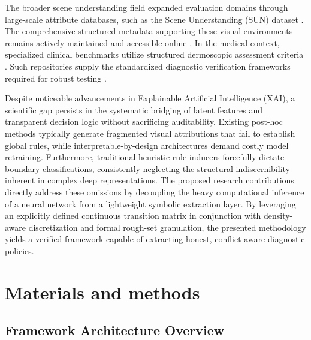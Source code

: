 \documentclass[make,article,submit,pdftex,moreauthors]{Definitions/mdpi}
\begin{document}
The broader scene understanding field expanded evaluation domains through large-scale attribute databases, such as the Scene Understanding (SUN) dataset \cite{Patterson2014SUN}. The comprehensive structured metadata supporting these visual environments remains actively maintained and accessible online \cite{SUNAttributesWebsite}. In the medical context, specialized clinical benchmarks utilize structured dermoscopic assessment criteria \cite{Kawahara2019Derm7pt}. Such repositories supply the standardized diagnostic verification frameworks required for robust testing \cite{Derm7ptWebsite}.

Despite noticeable advancements in Explainable Artificial Intelligence (XAI), a scientific gap persists in the systematic bridging of latent features and transparent decision logic without sacrificing auditability. Existing post-hoc methods typically generate fragmented visual attributions that fail to establish global rules, while interpretable-by-design architectures demand costly model retraining. Furthermore, traditional heuristic rule inducers forcefully dictate boundary classifications, consistently neglecting the structural indiscernibility inherent in complex deep representations. The proposed research contributions directly address these omissions by decoupling the heavy computational inference of a neural network from a lightweight symbolic extraction layer. By leveraging an explicitly defined continuous transition matrix in conjunction with density-aware discretization and formal rough-set granulation, the presented methodology yields a verified framework capable of extracting honest, conflict-aware diagnostic policies.

\section{Materials and methods}
\label{sec:methods}

\subsection{Framework Architecture Overview}
\label{subsec:framework_overview}
\end{document}
